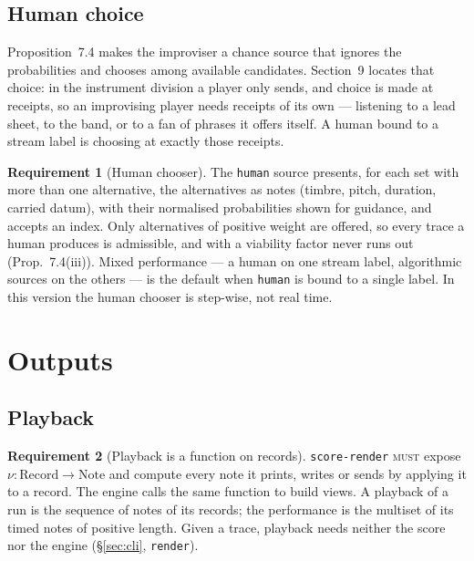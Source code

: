 \documentclass[11pt,a4paper]{article}
\theoremstyle{definition}
\newtheorem{requirement}{Requirement}[section]
\theoremstyle{remark}
\newcommand{\MUST}{\textsc{must}}
\begin{document}
\subsection{Human choice}\label{ssec:human}

Proposition~7.4 makes the improviser a chance source that ignores the
probabilities and chooses among available candidates. Section~9 locates that
choice: in the instrument division a player only sends, and choice is made at
receipts, so an improvising player needs receipts of its own --- listening to a
lead sheet, to the band, or to a fan of phrases it offers itself. A human bound
to a stream label is choosing at exactly those receipts.

\begin{requirement}[Human chooser]\label{req:human}
The \texttt{human} source presents, for each set with more than one
alternative, the alternatives as notes (timbre, pitch, duration, carried datum),
with their normalised probabilities shown for guidance, and accepts an index.
Only alternatives of positive weight are offered, so every trace a human
produces is admissible, and with a viability factor never runs out
(Prop.~7.4(iii)). Mixed performance --- a human on one stream label, algorithmic
sources on the others --- is the default when \texttt{human} is bound to a
single label. In this version the human chooser is step-wise, not real time.
\end{requirement}

\section{Outputs}\label{sec:outputs}

\subsection{Playback}

\begin{requirement}[Playback is a function on records]\label{req:playback}
\texttt{score-render} \MUST{} expose $\nu:\mathrm{Record}\to\mathrm{Note}$ and
compute every note it prints, writes or sends by applying it to a record. The
engine calls the same function to build views. A playback of a run is the
sequence of notes of its records; the performance is the multiset of its timed
notes of positive length. Given a trace, playback needs neither the score nor
the engine (\S\ref{sec:cli}, \texttt{render}).
\end{requirement}
\end{document}
